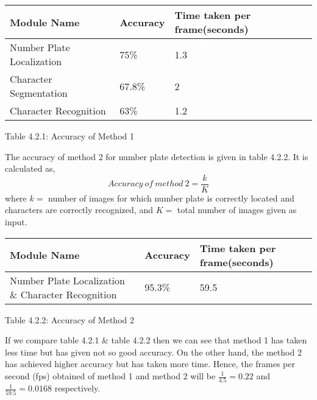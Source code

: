 \vspace{.2in}

\begin{tabu} to 0.8\textwidth { | X[l] | X[c] | X[r] | }
 \hline
 \textbf{Module Name} & \textbf{Accuracy} & \textbf{Time taken per frame(seconds)} \\
 \hline
 Number Plate Localization\vspace{.1in} & 75\%  & 1.3  \\
\hline
Character Segmentation\vspace{.1in} & 67.8\% & 2 \\
\hline
Character Recognition\vspace{.1in} & 63\% & 1.2 \\
\hline
\end{tabu}
\vspace{.1in}
\par Table 4.2.1: Accuracy of Method 1
\vspace{.2in}
\par The accuracy of method 2 for number plate detection is given in table 4.2.2. It is calculated as,
$$ Accuracy\ of\ method\ 2=\frac{k}{K}$$ where $k=$ number of images for which number plate is correctly located and characters are correctly recognized, and $K=$ total number of images given as input.

\vspace{.2in}

\begin{tabu} to 0.8\textwidth { | X[l] | X[c] | X[r] | }

 \hline
 \textbf{Module Name} & \textbf{Accuracy} & \textbf{Time taken per frame(seconds)} \\
 \hline
 Number Plate Localization \& Character Recognition\vspace{.1in} & 95.3\%  & 59.5  \\
\hline
\end{tabu}
\vspace{.1in}
\par Table 4.2.2: Accuracy of Method 2\\
\par If we compare table 4.2.1 \& table 4.2.2 then we can see that method 1 has taken less time but has given not so good accuracy. On the other hand, the method 2 has achieved higher accuracy but has taken more time. Hence, the frames per second (fps) obtained of method 1 and method 2 will be $\frac{1}{4.5}=0.22$ and $\frac{1}{59.5}=0.0168$ respectively.
